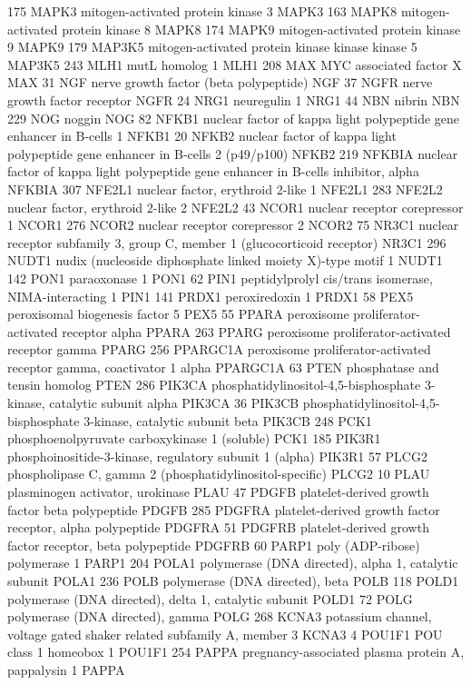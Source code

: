 175	MAPK3	mitogen-activated protein kinase 3	MAPK3
163	MAPK8	mitogen-activated protein kinase 8	MAPK8
174	MAPK9	mitogen-activated protein kinase 9	MAPK9
179	MAP3K5	mitogen-activated protein kinase kinase kinase 5	MAP3K5
243	MLH1	mutL homolog 1	MLH1
208	MAX	MYC associated factor X	MAX
31	NGF	nerve growth factor (beta polypeptide)	NGF
37	NGFR	nerve growth factor receptor	NGFR
24	NRG1	neuregulin 1	NRG1
44	NBN	nibrin	NBN
229	NOG	noggin	NOG
82	NFKB1	nuclear factor of kappa light polypeptide gene enhancer in B-cells 1	NFKB1
20	NFKB2	nuclear factor of kappa light polypeptide gene enhancer in B-cells 2 (p49/p100)	NFKB2
219	NFKBIA	nuclear factor of kappa light polypeptide gene enhancer in B-cells inhibitor, alpha	NFKBIA
307	NFE2L1	nuclear factor, erythroid 2-like 1	NFE2L1
283	NFE2L2	nuclear factor, erythroid 2-like 2	NFE2L2
43	NCOR1	nuclear receptor corepressor 1	NCOR1
276	NCOR2	nuclear receptor corepressor 2	NCOR2
75	NR3C1	nuclear receptor subfamily 3, group C, member 1 (glucocorticoid receptor)	NR3C1
296	NUDT1	nudix (nucleoside diphosphate linked moiety X)-type motif 1	NUDT1
142	PON1	paraoxonase 1	PON1
62	PIN1	peptidylprolyl cis/trans isomerase, NIMA-interacting 1	PIN1
141	PRDX1	peroxiredoxin 1	PRDX1
58	PEX5	peroxisomal biogenesis factor 5	PEX5
55	PPARA	peroxisome proliferator-activated receptor alpha	PPARA
263	PPARG	peroxisome proliferator-activated receptor gamma	PPARG
256	PPARGC1A	peroxisome proliferator-activated receptor gamma, coactivator 1 alpha	PPARGC1A
63	PTEN	phosphatase and tensin homolog	PTEN
286	PIK3CA	phosphatidylinositol-4,5-bisphosphate 3-kinase, catalytic subunit alpha	PIK3CA
36	PIK3CB	phosphatidylinositol-4,5-bisphosphate 3-kinase, catalytic subunit beta	PIK3CB
248	PCK1	phosphoenolpyruvate carboxykinase 1 (soluble)	PCK1
185	PIK3R1	phosphoinositide-3-kinase, regulatory subunit 1 (alpha)	PIK3R1
57	PLCG2	phospholipase C, gamma 2 (phosphatidylinositol-specific)	PLCG2
10	PLAU	plasminogen activator, urokinase	PLAU
47	PDGFB	platelet-derived growth factor beta polypeptide	PDGFB
285	PDGFRA	platelet-derived growth factor receptor, alpha polypeptide	PDGFRA
51	PDGFRB	platelet-derived growth factor receptor, beta polypeptide	PDGFRB
60	PARP1	poly (ADP-ribose) polymerase 1	PARP1
204	POLA1	polymerase (DNA directed), alpha 1, catalytic subunit	POLA1
236	POLB	polymerase (DNA directed), beta	POLB
118	POLD1	polymerase (DNA directed), delta 1, catalytic subunit	POLD1
72	POLG	polymerase (DNA directed), gamma	POLG
268	KCNA3	potassium channel, voltage gated shaker related subfamily A, member 3	KCNA3
4	POU1F1	POU class 1 homeobox 1	POU1F1
254	PAPPA	pregnancy-associated plasma protein A, pappalysin 1	PAPPA
